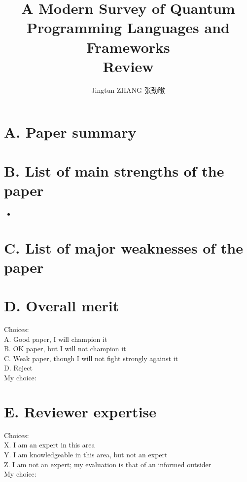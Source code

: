 \documentclass[]{ctexart}
\title{
    A Modern Survey of Quantum Programming Languages and Frameworks\\
    Review
}
\author{
    Jingtun ZHANG 张劲暾
}
\begin{document}
    \maketitle
    \setcounter{secnumdepth}{0} %
    \section{A. Paper summary}
    \section{B. List of main strengths of the paper}
        \begin{itemize}
            \item 
        \end{itemize}
    \section{C. List of major weaknesses of the paper}
    \section{D. Overall merit}
    \noindent Choices:\\
    \hspace*{2em}A. Good paper, I will champion it\\
    \hspace*{2em}B. OK paper, but I will not champion it\\
    \hspace*{2em}C. Weak paper, though I will not fight strongly against it\\
    \hspace*{2em}D. Reject\\
    My choice:
    \section{E. Reviewer expertise}
    \noindent Choices:\\
    \hspace*{2em}X. I am an expert in this area\\
    \hspace*{2em}Y. I am knowledgeable in this area, but not an expert\\
    \hspace*{2em}Z. I am not an expert; my evaluation is that of an informed outsider\\
    My choice:
\end{document}
